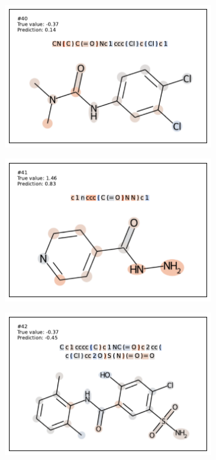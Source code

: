 \begin{figure}
\begin{subfigure}[b]{0.33\textwidth}
\end{subfigure}\begin{subfigure}[b]{0.33\textwidth} 
  \centering 
  \includegraphics[width=\textwidth]{figures/esol/esol40.pdf} 
\end{subfigure}
\begin{subfigure}[b]{0.33\textwidth} 
  \centering 
  \includegraphics[width=\textwidth]{figures/esol/esol41.pdf} 
\end{subfigure}\begin{subfigure}[b]{0.33\textwidth} 
  \centering 
  \includegraphics[width=\textwidth]{figures/esol/esol42.pdf} 

\end{subfigure}
\end{figure}
